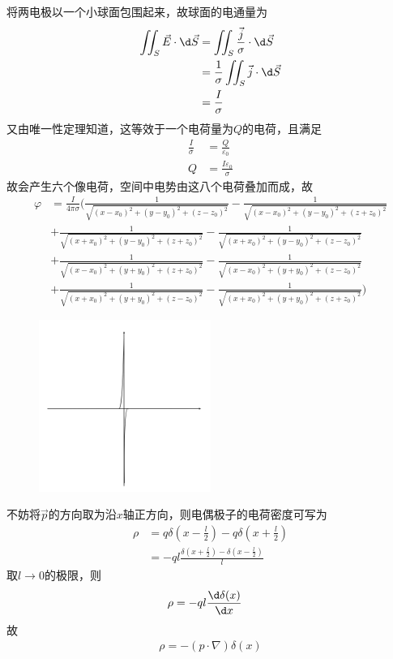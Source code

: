\documentclass{phyasgn}
\begin{document}
\begin{sol}[5]
  将两电极以一个小球面包围起来，故球面的电通量为
  \begin{align*}
    \iint_S\vec{E}\cdot\d \vec{S}&=\iint_S\frac{\vec{j}}{\sigma}\cdot\d \vec{S}\\
    &=\frac{1}{\sigma}\iint_S\vec{j}\cdot\d \vec{S}\\
    &=\frac{I}{\sigma}
  \end{align*}
  又由唯一性定理知道，这等效于一个电荷量为$Q$的电荷，且满足
  \begin{align*}
    \frac{I}{\sigma}&=\frac{Q}{\varepsilon_0}\\
    Q&=\frac{I\varepsilon_0}{\sigma}
  \end{align*}
  故会产生六个像电荷，空间中电势由这八个电荷叠加而成，故
  \begin{align*}
    \varphi&=\frac{I}{4\pi\sigma}\Bigg(\frac{1}{\sqrt{(x-x_0)^2+(y-y_0)^2+(z-z_0)^2}}-\frac{1}{\sqrt{(x-x_0)^2+(y-y_0)^2+(z+z_0)^2}}\\
    &+\frac{1}{\sqrt{(x+x_0)^2+(y-y_0)^2+(z+z_0)^2}}-\frac{1}{\sqrt{(x+x_0)^2+(y-y_0)^2+(z-z_0)^2}}\\
    &+\frac{1}{\sqrt{(x-x_0)^2+(y+y_0)^2+(z+z_0)^2}}-\frac{1}{\sqrt{(x-x_0)^2+(y+y_0)^2+(z-z_0)^2}}\\
    &+\frac{1}{\sqrt{(x+x_0)^2+(y+y_0)^2+(z-z_0)^2}}-\frac{1}{\sqrt{(x+x_0)^2+(y+y_0)^2+(z+z_0)^2}}\Bigg)
  \end{align*}
\end{sol}

\begin{sol}[6]
  \begin{figure}[H]
    \centering
    \includegraphics[width=0.5\textwidth]{狄拉克函数导数.jpg}
  \end{figure}
  不妨将$\vec{p}$的方向取为沿$x$轴正方向，则电偶极子的电荷密度可写为
  \begin{align*}
    \rho&=q\delta(x-\frac{l}{2})-q\delta(x+\frac{l}{2})\\
    &=-ql\frac{\delta(x+\frac{l}{2})-\delta(x-\frac{l}{2})}{l}
  \end{align*}
  取$l\to 0$的极限，则
  \begin{align*}
    \rho&=-ql\frac{\d \delta(x)}{\d x}
  \end{align*}
  故
  \begin{align*}
    \rho=-(p\cdot\nabla)\delta(x)
  \end{align*}
\end{sol}
\end{document}
